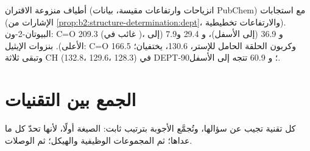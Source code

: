 \begin{omfigure}
\begin{minipage}[t]{0.49\linewidth}
\par
{}
\end{minipage}

{\small أطياف  منزوعة الاقتران (انزياحات وارتفاعات مقيسة، بيانات PubChem) مع استجابات
 (الإشارات من \cref{prop:b2:structure-determination:dept}، والارتفاعات تخطيطية). البيوتان-2-ون: C=O
209.3 (غائب في )، و 36.9 (إلى الأسفل)، و 29.4 و7.9 (إلى الأعلى). بنزوات الإيثيل: C=O 166.5 
وكربون الحلقة الحامل للإستر، 130.6، يختفيان؛ وتبقى ثلاثة CH  (132.8، 129.6، 128.3) في
DEPT-90؛ و 60.9 تتجه إلى الأسفل.}
\end{omfigure}

\section{الجمع بين التقنيات}

كل تقنية تجيب عن سؤالها، وتُجمَّع الأجوبة بترتيب ثابت: الصيغة
أولًا، لأنها تحدّ كل ما عداها؛ ثم المجموعات الوظيفية والهيكل؛ ثم
الوصلات.

